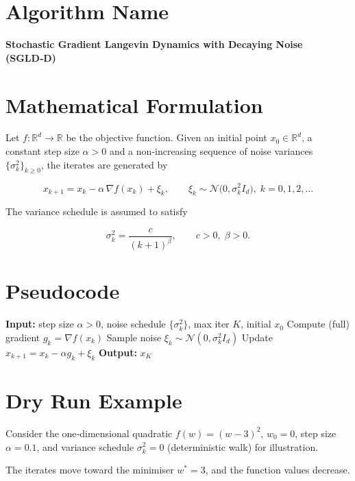 \documentclass{article}
\newcommand{\R}{\mathbb{R}}
\begin{document}
\section*{Algorithm Name}
\textbf{Stochastic Gradient Langevin Dynamics with Decaying Noise (SGLD‑D)}  

\section*{Mathematical Formulation}
Let $f:\R^{d}\to\R$ be the objective function.  
Given an initial point $x_{0}\in\R^{d}$, a constant step size $\alpha>0$ and a non‑increasing sequence of noise variances $\{\sigma_{k}^{2}\}_{k\ge 0}$, the iterates are generated by  

\[
\boxed{
x_{k+1}=x_{k}-\alpha\,\nabla f(x_{k})+\xi_{k},\qquad 
\xi_{k}\sim\mathcal{N}\!\bigl(0,\sigma_{k}^{2}I_{d}\bigr),\;k=0,1,2,\dots
}
\tag{1}
\]

The variance schedule is assumed to satisfy  

\[
\sigma_{k}^{2}= \frac{c}{(k+1)^{\beta}},\qquad c>0,\; \beta>0 .
\tag{2}
\]

\section*{Pseudocode}
\begin{algorithm}[H]
\caption{SGLD‑D}
\begin{algorithmic}[1]
\STATE \textbf{Input:} step size $\alpha>0$, noise schedule $\{\sigma_{k}^{2}\}$, max iter $K$, initial $x_{0}$
    \STATE Compute (full) gradient $g_{k}= \nabla f(x_{k})$
    \STATE Sample noise $\xi_{k}\sim \mathcal N(0,\sigma_{k}^{2}I_{d})$
    \STATE Update $x_{k+1}=x_{k}-\alpha g_{k}+\xi_{k}$
\ENDFOR
\STATE \textbf{Output:} $x_{K}$
\end{algorithmic}
\end{algorithm}

\section*{Dry Run Example}
Consider the one‑dimensional quadratic $f(w)=(w-3)^{2}$, $w_{0}=0$, step size $\alpha=0.1$, and variance schedule $\sigma_{k}^{2}=0$ (deterministic walk) for illustration.

The iterates move toward the minimiser $w^{*}=3$, and the function values decrease.
\end{document}
